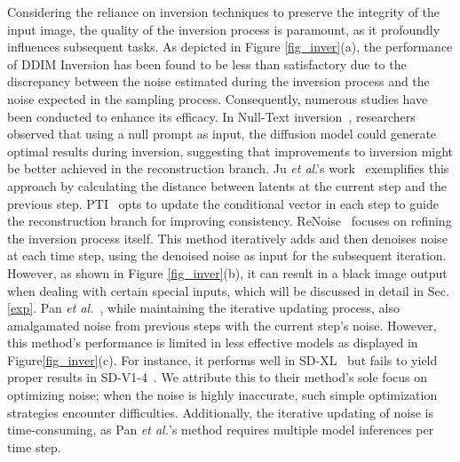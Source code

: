 \documentclass[letterpaper]{article} %
\begin{document}
%
Considering the reliance on inversion techniques to preserve the integrity of the input image, the quality of the inversion process is paramount, as it profoundly influences subsequent tasks.
%
%
As depicted in Figure \ref{fig_inver}(a), the performance of DDIM Inversion has been found to be less than satisfactory due to the discrepancy between the noise estimated during the inversion process and the noise expected in the sampling process.
%
Consequently, numerous studies have been conducted to enhance its efficacy.
%
In Null-Text inversion~\cite{mokady2023null}, researchers observed that using a null prompt as input, the diffusion model could generate optimal results during inversion, suggesting that improvements to inversion might be better achieved in the reconstruction branch.
%
Ju \emph{et al}.'s work~\cite{ju2023direct} exemplifies this approach by calculating the distance between latents at the current step and the previous step.
%
PTI~\cite{dong2023prompt} opts to update the conditional vector in each step to guide the reconstruction branch for improving consistency.
%
ReNoise~\cite{garibi2024renoise} focuses on refining the inversion process itself. This method iteratively adds and then denoises noise at each time step, using the denoised noise as input for the subsequent iteration. However, as shown in Figure \ref{fig_inver}(b), it can result in a black image output when dealing with certain special inputs, which will be discussed in detail in Sec.\,\ref{exp}.
%
Pan \emph{et al.}~\cite{pan2023effective}, while maintaining the iterative updating process, also amalgamated noise from previous steps with the current step's noise. However, this method's performance is limited in less effective models as displayed in Figure\ref{fig_inver}(c). For instance, it performs well in SD-XL~\cite{podell2023sdxl} but fails to yield proper results in SD-V1-4~\cite{rombach2022high}. We attribute this to their method's sole focus on optimizing noise; when the noise is highly inaccurate, such simple optimization strategies encounter difficulties. Additionally, the iterative updating of noise is time-consuming, as Pan \emph{et al.}'s method requires multiple model inferences per time step.
\end{document}

